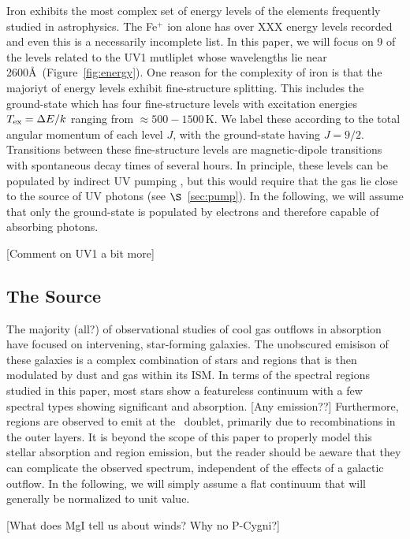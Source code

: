 \documentclass[12pt,preprint]{aastex}
\begin{document}
Iron exhibits the most complex set of energy levels of the elements
frequently studied in astrophysics.  The Fe$^+$ ion alone has over XXX
energy levels recorded \citep{iron} and even this is a necessarily
incomplete list.  In this paper, we will focus on 9 of the levels
related to the UV1 mutliplet whose wavelengths lie near 2600\AA\
(Figure~\ref{fig:energy}).  One reason for the complexity of iron is
that the majoriyt of energy levels exhibit fine-structure splitting.
This includes the ground-state which has four fine-structure levels with
excitation energies $T_{\rm ex} = \Delta E / k$ ranging from $\approx
500-1500$\,K.  We label these according to the total angular momentum
of each level $J$, with the ground-state having $J=9/2$.
Transitions between these fine-structure levels are magnetic-dipole
transitions with spontaneous decay times of several hours.  In
principle, these levels can be populated by indirect UV pumping
\citep[e.g][]{sv02,pcb06}, but this would require that the gas lie
close to the source of UV photons (see $\S$~\ref{sec:pump}).  In the
following, we will assume that only the ground-state is populated by
electrons and therefore capable of absorbing photons.

[Comment on UV1 a bit more]

\subsection{The Source}

The majority (all?) of observational studies of cool gas outflows in
absorption have focused on intervening, star-forming galaxies.  The
unobscured emisison of these galaxies is a complex combination of
stars and \ion{H}{2} regions that is then modulated by dust and gas
within its ISM.  In terms of the spectral regions studied in this
paper, most stars show a featureless continuum with a few spectral
types showing significant \ion{Mg}{2} and \ion{Fe}{2} absorption.
[Any emission??]  Furthermore, \ion{H}{2} regions are observed to emit
at the \mgiid\ doublet, primarily due to recombinations in the outer
layers.  It is beyond the scope of this paper to properly model this
stellar absorption and \ion{H}{2} region emission, but the reader
should be aeware that they can complicate the observed spectrum,
independent of the effects of a galactic outflow.
In the following, we will simply assume a flat continuum that will
generally be normalized to unit value.

[What does MgI tell us about winds?  Why no P-Cygni?]
\end{document}
